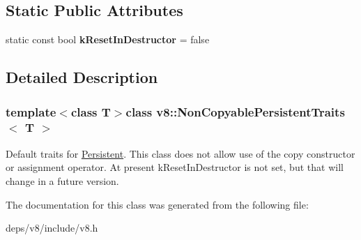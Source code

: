 \subsection*{Static Public Attributes}
\begin{DoxyCompactItemize}
\item 
\hypertarget{classv8_1_1_non_copyable_persistent_traits_a650880d85ff80634c30a195d20329681}{}static const bool {\bfseries k\+Reset\+In\+Destructor} = false\label{classv8_1_1_non_copyable_persistent_traits_a650880d85ff80634c30a195d20329681}

\end{DoxyCompactItemize}


\subsection{Detailed Description}
\subsubsection*{template$<$class T$>$class v8\+::\+Non\+Copyable\+Persistent\+Traits$<$ T $>$}

Default traits for \hyperlink{classv8_1_1_persistent}{Persistent}. This class does not allow use of the copy constructor or assignment operator. At present k\+Reset\+In\+Destructor is not set, but that will change in a future version. 

The documentation for this class was generated from the following file\+:\begin{DoxyCompactItemize}
\item 
deps/v8/include/v8.\+h\end{DoxyCompactItemize}
